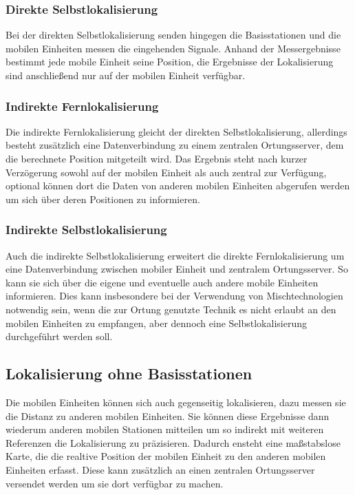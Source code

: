 \subsubsection{Direkte Selbstlokalisierung} 
Bei der direkten Selbstlokalisierung senden hingegen die Basisstationen und die mobilen Einheiten messen die eingehenden Signale. Anhand der Messergebnisse bestimmt jede mobile Einheit seine Position, die Ergebnisse der Lokalisierung sind anschließend nur auf der mobilen Einheit verfügbar. \\

\subsubsection{Indirekte Fernlokalisierung} 
Die indirekte Fernlokalisierung gleicht der direkten Selbstlokalisierung, allerdings besteht zusätzlich eine Datenverbindung zu einem zentralen Ortungsserver, dem die berechnete Position mitgeteilt wird. Das Ergebnis steht nach kurzer Verzögerung sowohl auf der mobilen Einheit als auch zentral zur Verfügung, optional können dort die Daten von anderen mobilen Einheiten abgerufen werden um sich über deren Positionen zu informieren. \\

\subsubsection{Indirekte Selbstlokalisierung} 
Auch die indirekte Selbstlokalisierung erweitert die direkte Fernlokalisierung um eine Datenverbindung zwischen mobiler Einheit und zentralem Ortungsserver. 
So kann sie sich über die eigene und eventuelle auch andere mobile Einheiten informieren. 
Dies kann insbesondere bei der Verwendung von Mischtechnologien notwendig sein, wenn die zur Ortung genutzte Technik es nicht erlaubt an den mobilen Einheiten zu empfangen, aber dennoch eine Selbstlokalisierung durchgeführt werden soll.

\subsection{Lokalisierung ohne Basisstationen} 
Die mobilen Einheiten können sich auch gegenseitig lokalisieren, dazu messen sie die Distanz zu anderen mobilen Einheiten.
Sie können diese Ergebnisse dann wiederum anderen mobilen Stationen mitteilen um so indirekt mit weiteren Referenzen die Lokalisierung zu präzisieren. 
Dadurch ensteht eine maßstabslose Karte, die die realtive Position der mobilen Einheit zu den anderen mobilen Einheiten erfasst.
Diese kann zusätzlich an einen zentralen Ortungsserver versendet werden um sie dort verfügbar zu machen.

